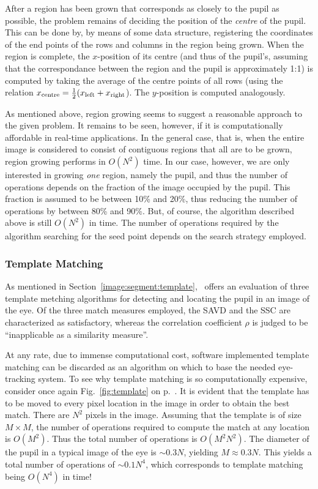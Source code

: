 After a region has been grown that corresponds as closely to the pupil
as possible, the problem remains of deciding the position of the {\em
  centre\/} of the pupil.  This can be done by, by means of some data
structure, registering the coordinates of the end points of the rows
and columns in the region being grown.  When the region is complete,
the $x$-position of its centre (and thus of the pupil's, assuming that
the correspondance between the region and the pupil is approximately
1:1) is computed by taking the average of the centre points of all
rows (using the relation $x_{\mbox{\scriptsize centre}}=\frac{1}{2}
(x_{\mbox{\scriptsize left}}+x_{\mbox{\scriptsize right}}$).  The
$y$-position is computed analogously.

As mentioned above, region growing seems to suggest a reasonable
approach to the given problem.  It remains to be seen, however, if it
is computationally affordable in real-time applications.  In the
general case, that is, when the entire image is considered to consist
of contiguous regions that all are to be grown, region growing
performs in $O(N^{2})$ time.  In our case, however, we are only
interested in growing {\em one\/} region, namely the pupil, and thus
the number of operations depends on the fraction of the image occupied
by the pupil.  This fraction is assumed to be between 10\% and 20\%,
thus reducing the number of operations by between 80\% and 90\%.  But,
of course, the algorithm described above is still $O(N^{2})$ in time.
The number of operations required by the algorithm searching for the
seed point depends on the search strategy employed.

\subsubsection{Template Matching}

As mentioned in Section~\ref{image:segment:template},~\cite{template}
offers an evaluation of three template metching algorithms for
detecting and locating the pupil in an image of the eye.  Of the three
match measures employed, the SAVD and the SSC are characterized as
satisfactory, whereas the correlation coefficient $\rho$ is judged to
be ``inapplicable as a similarity measure''.

At any rate, due to immense computational cost, software implemented
template matching can be discarded as an algorithm on which to base
the needed eye-tracking system.  To see why template matching is so
computationally expensive, consider once again Fig.~\ref{fig:template}
on p.~\pageref{fig:template}.  It is evident that the template has to
be moved to every pixel location in the image in order to obtain the
best match.  There are $N^{2}$ pixels in the image.  Assuming that the
template is of size $M\times M$, the number of operations required to
compute the match at any location is $O(M^{2})$.  Thus the total
number of operations is $O(M^{2}N^{2})$.  The diameter of the pupil in
a typical image of the eye is $\sim 0.3N$, yielding $M\approx 0.3N$.
This yields a total number of operations of $\sim 0.1N^{4}$, which
corresponds to template matching being $O(N^{4})$ in time!

